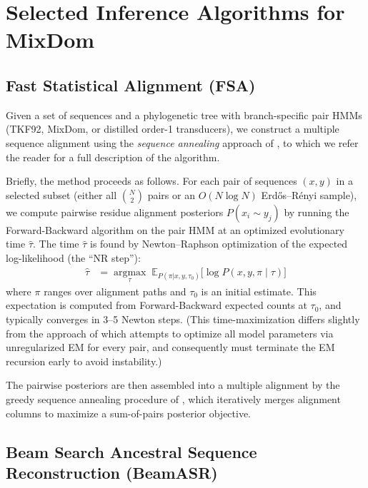 \section{Selected Inference Algorithms for MixDom}

\subsection{Fast Statistical Alignment (FSA)}
\label{sec:fsa}

Given a set of sequences and a phylogenetic tree with branch-specific pair HMMs
(TKF92, MixDom, or distilled order-1 transducers),
we construct a multiple sequence alignment using the
\emph{sequence annealing} approach of \cite{BradleyEtAl2009},
to which we refer the reader for a full description of the algorithm.

Briefly, the method proceeds as follows.
For each pair of sequences $(x,y)$ in a selected subset
(either all $\binom{N}{2}$ pairs or an $O(N \log N)$ Erd\H{o}s--R\'enyi sample),
we compute pairwise residue alignment posteriors $P(x_i \sim y_j)$
by running the Forward-Backward algorithm on the pair HMM at an
optimized evolutionary time $\hat{\tau}$.
The time $\hat{\tau}$ is found by Newton--Raphson optimization
of the expected log-likelihood (the ``NR step''):
\begin{align}
\hat{\tau} &= \operatorname*{argmax}_\tau \; \mathbb{E}_{P(\pi | x,y,\tau_0)} \bigl[ \log P(x,y,\pi \mid \tau) \bigr]
\label{eq:fsa-nr}
\end{align}
where $\pi$ ranges over alignment paths and $\tau_0$ is an initial estimate.
This expectation is computed from Forward-Backward expected counts
at $\tau_0$, and typically converges in 3--5 Newton steps.
(This time-maximization differs slightly from the approach of \cite{BradleyEtAl2009}
which attempts to optimize all model parameters via unregularized EM for every pair,
and consequently must terminate the EM recursion early to avoid instability.)

The pairwise posteriors are then assembled into a multiple alignment
by the greedy sequence annealing procedure of \cite{BradleyEtAl2009},
which iteratively merges alignment columns to maximize a sum-of-pairs
posterior objective.


\subsection{Beam Search Ancestral Sequence Reconstruction (BeamASR)}
\label{sec:beam-ancestor}

